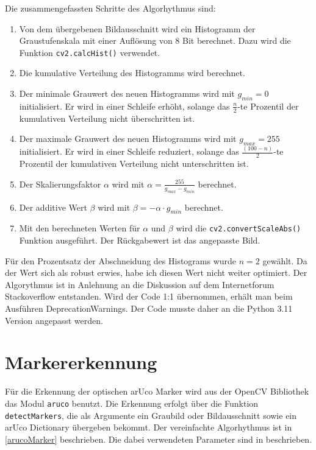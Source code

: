     Die zusammengefassten Schritte des Algorhythmus sind:
    \begin{enumerate}
        \item Von dem übergebenen Bildausschnitt wird ein Histogramm der Graustufenskala mit einer Auflösung von 8 Bit berechnet. Dazu wird die Funktion \verb|cv2.calcHist()| verwendet.
        \item Die kumulative Verteilung des Histogramms wird berechnet.
        \item Der minimale Grauwert des neuen Histogramms wird mit $g_{min} = 0$ initialisiert. Er wird in einer Schleife erhöht, solange das $\frac{n}{2}$-te Prozentil der kumulativen Verteilung nicht überschritten ist.
        \item Der maximale Grauwert des neuen Histogramms wird mit $g_{max} = 255$ initialisiert. Er wird in einer Schleife reduziert, solange das $\frac{(100-n)}{2}$-te Prozentil der kumulativen Verteilung nicht unterschritten ist.
        \item Der Skalierungsfaktor $\alpha$ wird mit $\alpha = \frac{255}{g_{max} - g_{min}}$ berechnet.
        \item Der additive Wert $\beta$ wird mit $\beta = -\alpha \cdot g_{min}$ berechnet.
        \item Mit den berechneten Werten für $\alpha$ und $\beta$ wird die \verb|cv2.convertScaleAbs()| Funktion ausgeführt. Der Rückgabewert ist das angepasste Bild.
    \end{enumerate}

    Für den Prozentsatz der Abschneidung des Histograms wurde $n=2$ gewählt. Da der Wert sich als robust erwies, habe ich diesen Wert nicht weiter optimiert.
    Der Algorythmus ist in Anlehnung an die Diskussion auf dem Internetforum Stackoverflow \cite{SOcontrast} entstanden. 
    Wird der Code 1:1 übernommen, erhält man beim Ausführen DeprecationWarnings. Der Code musste daher an die Python 3.11 Version angepasst werden. 
    
    \clearpage
    
    \clearpage

    \section {Markererkennung}

    Für die Erkennung der optischen arUco Marker wird aus der OpenCV Bibliothek das Modul \verb|aruco| benutzt. 
    Die Erkennung erfolgt über die Funktion \verb|detectMarkers|, die als Argumente ein Graubild oder Bildausschnitt sowie ein arUco Dictionary übergeben bekommt.
    Der vereinfachte Algorhythmus ist in \ref{arucoMarker} beschrieben. Die dabei verwendeten Parameter sind in \cite[OpenCV]{OpenCVaruco} beschrieben.
    
